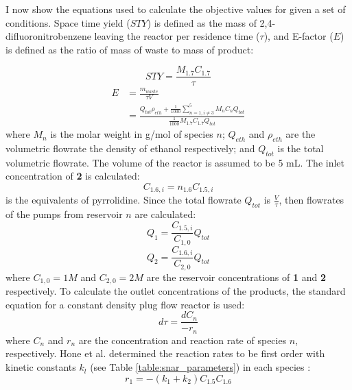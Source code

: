 I now show the equations used to calculate the objective values for given a set of conditions. Space time yield ($STY$) is defined as the mass of 2,4-difluoronitrobenzene leaving the reactor per residence time ($\tau$), and E-factor ($E$) is defined as the ratio of mass of waste to mass of product:

\begin{equation}
    \label{sty}
	STY = \frac{M_{1.7} C_{1.7}}{\tau}
\end{equation}
\begin{equation}
    \label{e_factor}
	\begin{split}
	 E & = \frac{m_{waste}}{\tau V} \\ 
	   & = \frac{Q_{tot}\rho_{eth} + \frac{1}{1000}\sum_{n=1, i \neq 3}^5 M_nC_nQ_{tot}}{\frac{1}{1000}M_{1.7}C_{1.7}Q_{tot}}		
	\end{split}
\end{equation}
where $M_n$ is the molar weight in g/mol of species $n$; $Q_{eth}$ and $\rho_{eth}$ are the volumetric flowrate the density of ethanol respectively; and $Q_{tot}$ is the total volumetric flowrate. The volume of the reactor is assumed to be 5 mL. The inlet concentration of \textbf{2} is calculated:
\begin{equation}
    C_{1.6,i} = n_{1.6} C_{1.5,i}
\end{equation}
is the equivalents of pyrrolidine. Since the total flowrate $Q_{tot}$ is $\frac{V}{\tau}$, then flowrates of the pumps from reservoir $n$ are calculated:
\begin{equation}
    Q_1 = \frac{C_{1.5,i}}{C_{1,0}}Q_{tot}
\end{equation}
\begin{equation}
    Q_2 = \frac{C_{1.6,i}}{C_{2,0}}Q_{tot}
\end{equation}
where $C_{1,0}=1 M$ and $C_{2,0}=2 M$ are the reservoir concentrations of \textbf{1} and \textbf{2} respectively. To calculate the outlet concentrations of the products, the standard equation for a constant density plug flow reactor is used:
\begin{equation}
	\label{pfr}
	d\tau = \frac{dC_n}{- r_n}
\end{equation}
where $C_n$ and $r_n$ are the concentration and reaction rate of species $n$, respectively. Hone et al. determined the reaction rates to be first order with kinetic constants $k_l$ (see Table \ref{table:snar_parameters}) in each species \cite{Hone2017}:
\begin{equation}
    \label{equation:r_1}
	r_{1} = -(k_1+k_2)C_{1.5}C_{1.6}	
\end{equation}
